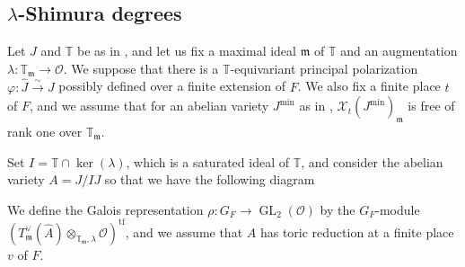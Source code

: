\documentclass[a4paper, notitlepage, 10pt]{amsart}
\theoremstyle{plain} %
\theoremstyle{definition} %
\theoremstyle{remark} %
\numberwithin{equation}{section}
\newcommand{\bbT}{\mathbb T}
\newcommand{\GL}{\operatorname{GL}} %
\newcommand{\tf}{\operatorname{tf}} %
\begin{document}
\subsection{$\lambda$-Shimura degrees}\label{lambdashimuradeg}
Let $J$ and $\bbT$ be as in , and let us fix a maximal ideal $\mathfrak{m}$ of $\bbT$ and an augmentation $\lambda\colon \bbT_{\mathfrak{m}}\to \mathcal{O}$. We suppose that there is a $\bbT$-equivariant principal polarization $\varphi\colon \widehat{J}\xrightarrow{\sim} J$ possibly defined over a finite extension of $F$. We also fix a finite place $t$ of $F$, and we assume that for an abelian variety $J^{\min}$ as in , $\mathcal{X}_t(J^{\min})_{\mathfrak{m}}$ is free of rank one over $\bbT_{\mathfrak{m}}$.

Set $I=\bbT \cap \ker(\lambda)$, which is a saturated ideal of $\bbT$, and consider the abelian variety $A=J/IJ$ so that we have the following diagram
\begin{center}
\end{center}
We define the Galois representation $\rho\colon G_F\to \GL_2(\mathcal{O})$ by the $G_F$-module $(T^\vee_{\mathfrak{m}}(\hat{A})\otimes_{\bbT_{\mathfrak{m}},\lambda}\mathcal{O})^{\tf}$, and we assume that $A$ has toric reduction at a finite place $v$ of $F$.
\end{document}
